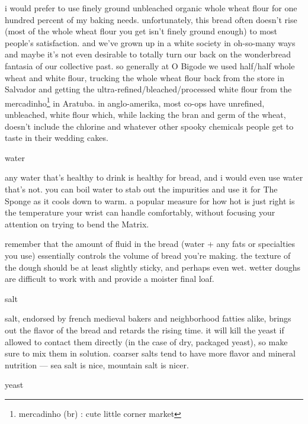 i would prefer to use finely ground unbleached organic whole wheat
flour for one hundred percent of my baking needs. unfortunately, this
bread often doesn't rise (most of the whole wheat flour you get
isn't finely ground enough) to most people's satisfaction. and
we've grown up in a white society in oh-so-many ways and maybe
it's not even desirable to totally turn our back on the wonderbread
fantasia of our collective past. so generally at O Bigode we used
half/half whole wheat and white flour, trucking the whole wheat flour
back from the store in Salvador and getting the
ultra-refined/bleached/processed white flour from the 
mercadinho\footnote{mercadinho (br) : cute little corner market} in
Aratuba. in anglo-amerika, most co-ops have unrefined, unbleached,
white flour which, while lacking the bran and germ of the wheat,
doesn't include the chlorine and whatever other spooky chemicals
people get to taste in their wedding cakes.

\begin{ingredients}\item water\end{ingredients}

any water that's healthy to drink is healthy for bread, and i would
even use water that's not. you can boil water to stab out the
impurities and use it for The Sponge as it cools down to warm. a
popular measure for how hot is just right is the temperature your
wrist can handle comfortably, without focusing your attention on
trying to bend the Matrix.
	
remember that the amount of fluid in the bread (water + any fats or
specialties you use) essentially controls the volume of bread
you're making. the texture of the dough should be at least slightly
sticky, and perhaps even wet. wetter doughs are difficult to work with
and provide a moister final loaf.

\begin{ingredients}\item salt\end{ingredients}

salt, endorsed by french medieval bakers and neighborhood fatties
alike, brings out the flavor of the bread and retards the rising
time. it will kill the yeast if allowed to contact them directly (in
the case of dry, packaged yeast), so make sure to mix them in
solution. coarser salts tend to have more flavor and mineral nutrition
--- sea salt is nice, mountain salt is nicer.

\begin{ingredients}\item yeast\end{ingredients}

